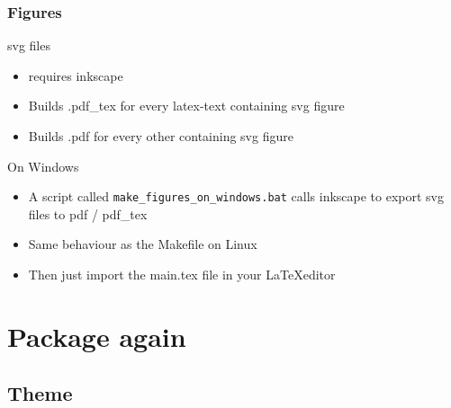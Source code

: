 \documentclass[c,12pt]{beamer}
\begin{document}
\begin{frame}
	\frametitle{Figures}
	\begin{block}{svg files}
		\begin{itemize}
			\item requires inkscape
			\item Builds .pdf\_tex for every latex-text containing svg figure
			\item Builds .pdf for every other containing svg figure
		\end{itemize}
	\end{block}

	\begin{block}{On Windows}
		\begin{itemize}
			\item A script called \texttt{make\_figures\_on\_windows.bat} calls inkscape to export svg files to pdf / pdf\_tex
			\item Same behaviour as the Makefile on Linux
			\item Then just import the main.tex file in your \LaTeX editor
		\end{itemize}
	\end{block}
\end{frame}

\section{Package again}
\subsection{Theme}
\end{document}
